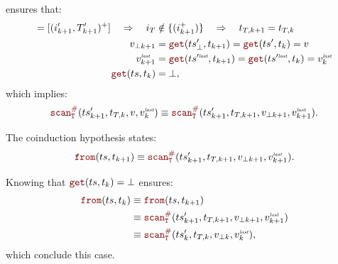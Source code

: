 \begin{skippableproof}
\begin{itemize}
\begin{itemize}
                         ensures that:
                        \begin{align*}
                            [(i_{k+1}, T_{k+1})^+] = [(i'_{k+1}, T'_{k+1})^+] \quad \Rightarrow
                            \quad i_T        & \notin \{(i_{k+1}^+)\} \quad \Rightarrow \quad
                            t_{T, k+1} = t_{T, k}                                                                                         \\
                            v_{\bot k+1}     & = \getAt{\ts'_\bot}{t_{k+1}} = \getAt{\ts'}{t_k} = v                                       \\
                            v^\explast_{k+1} & = \getAt{\ts^{\prime\explast}}{t_{k+1}} = \getAt{\ts^{\prime\explast}}{t_k} = v^\explast_k \\
                            \getAt{\ts}{t_k} & = \bot,
                        \end{align*}
                        which implies:
                        \begin{equation*}
                            \scanAux{\ts'_{k+1}}{T}{t_{T, k}}{v}{v^\explast_k} \equiv
                            \scanAux{\ts'_{k+1}}{T}{t_{T, k+1}}{v_{\bot k+1}}{v^\explast_{k+1}}.
                        \end{equation*}

                        The coinduction hypothesis states:
                        \begin{equation*}
                            \from{\ts}{t_{k+1}} \equiv \scanAux{\ts'_{k+1}}{T}{t_{T, k+1}}{v_{\bot k+1}}{v^\explast_{k+1}}.
                        \end{equation*}

                        Knowing that $\getAt{\ts}{t_k} = \bot$ ensures:
                        \begin{align*}
                            \from{\ts}{t_k} & \equiv \from{\ts}{t_{k+1}}                                                 \\
                                            & \equiv \scanAux{\ts'_{k+1}}{T}{t_{T, k+1}}{v_{\bot k+1}}{v^\explast_{k+1}} \\
                                            & \equiv \scanAux{\ts'_k}{T}{t_{T, k}}{v_{\bot k}}{v^\explast_k},
                        \end{align*}
                        which conclude this case.


\end{itemize}
\end{itemize}
\end{skippableproof}
